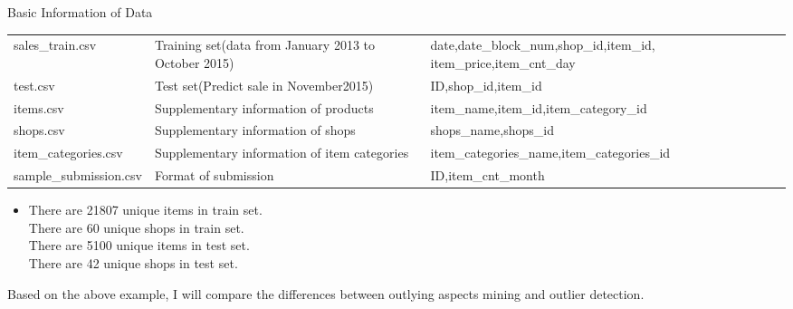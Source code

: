 \documentclass[
 size=12pt,
 paper=smartboard,  %
 mode=present, 		%
 display=slides, 	%
 style=tuliplab,  	%
 pauseslide,
 fleqn,leqno]{powerdot}
\begin{document}
\begin{slide}{Basic Information of Data}
\begin{center}
\begin{table}[h!]
{\begin{tabular}{p{5cm}p{8cm}p{8cm}}
\centering 
sales_train.csv
& { Training set(data from January 2013 to October 2015)} &  {date,date_block_num,shop_id,item_id, item_price,item_cnt_day}  \\
\centering 
test.csv
& {Test set(Predict sale in November2015)} &  {ID,shop_id,item_id} \\
\centering 
items.csv
&  {Supplementary information of products} &  {item_name,item_id,item_category_id}   \\
\centering 
shops.csv
&  {Supplementary information of shops} &  {shops_name,shops_id} \\
\centering 
item_categories.csv
&  {Supplementary information of item categories} &  {item_categories_name,item_categories_id} \\
\centering
sample_submission.csv
&  {Format of submission} &  {ID,item_cnt_month} \\
\bottomrule
\end{tabular}}
\end{table}
\end{center}
\vspace{.1mm}
    {
      \begin{itemize}
        \item
        There are 21807 unique items in train set.\\
        \smallskip
        There are 60 unique shops in train set.\\
        \smallskip
        There are 5100 unique items in test set.\\
        \smallskip
        There are 42 unique shops in test set.\\
        \smallskip
        \end{itemize}
    }
 




\begin{note}
Based on the above example,
I will compare the differences
between outlying aspects mining and outlier detection.


\end{note}
\end{slide}
\end{document}
